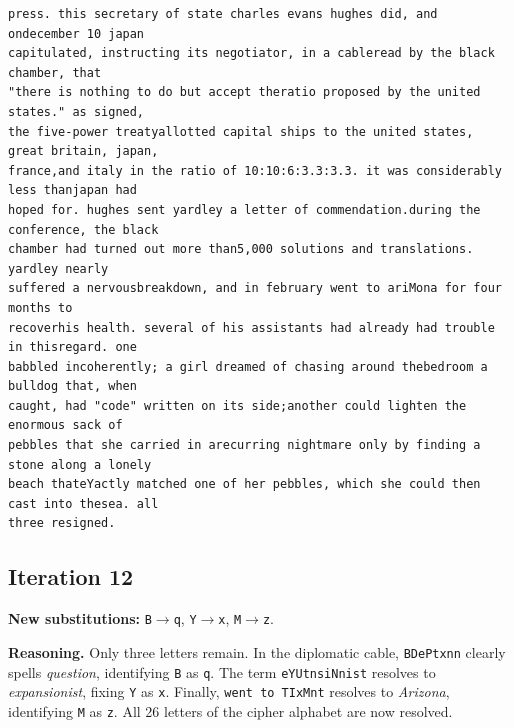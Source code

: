 \documentclass[11pt,a4paper]{article}
\begin{document}
\begin{lstlisting}[style=ciphertext,caption={Complete text after iteration 11}]
press. this secretary of state charles evans hughes did, and ondecember 10 japan
capitulated, instructing its negotiator, in a cableread by the black chamber, that
"there is nothing to do but accept theratio proposed by the united states." as signed,
the five-power treatyallotted capital ships to the united states, great britain, japan,
france,and italy in the ratio of 10:10:6:3.3:3.3. it was considerably less thanjapan had
hoped for. hughes sent yardley a letter of commendation.during the conference, the black
chamber had turned out more than5,000 solutions and translations. yardley nearly
suffered a nervousbreakdown, and in february went to ariMona for four months to
recoverhis health. several of his assistants had already had trouble in thisregard. one
babbled incoherently; a girl dreamed of chasing around thebedroom a bulldog that, when
caught, had "code" written on its side;another could lighten the enormous sack of
pebbles that she carried in arecurring nightmare only by finding a stone along a lonely
beach thateYactly matched one of her pebbles, which she could then cast into thesea. all
three resigned.
\end{lstlisting}

\newpage
\subsection{Iteration 12}

\noindent\textbf{New substitutions:} \texttt{B}$\rightarrow$\texttt{q}, \texttt{Y}$\rightarrow$\texttt{x}, \texttt{M}$\rightarrow$\texttt{z}.\par
\smallskip
\noindent\textbf{Reasoning.} Only three letters remain. In the diplomatic cable, \texttt{BDePtxnn} clearly spells \textit{question}, identifying \texttt{B} as \texttt{q}. The term \texttt{eYUtnsiNnist} resolves to \textit{expansionist}, fixing \texttt{Y} as \texttt{x}. Finally, \texttt{went to TIxMnt} resolves to \textit{Arizona}, identifying \texttt{M} as \texttt{z}. All 26 letters of the cipher alphabet are now resolved.
\end{document}
